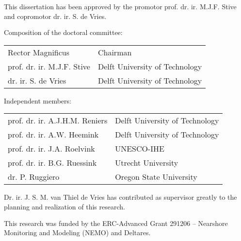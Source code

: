 \thispagestyle{empty}

\hfill

\vfill

\noindent This dissertation has been approved by the promotor
prof. dr. ir. M.J.F. Stive and copromotor dr. ir. S. de Vries.

\bigskip

\noindent Composition of the doctoral committee:

\begin{table}[h]
  \begin{tabular}{p{5cm} l}
    Rector Magnificus              & Chairman \\
    prof. dr. ir. M.J.F. Stive     & Delft University of Technology \\
    dr. ir. S. de Vries            & Delft University of Technology \\
  \end{tabular}
\end{table}

\noindent Independent members:

\begin{table}[h]
  \begin{tabular}{p{5cm} l}
    prof. dr. ir. A.J.H.M. Reniers & Delft University of Technology \\
    prof. dr. ir. A.W. Heemink     & Delft University of Technology \\
    prof. dr. ir. J.A. Roelvink    & UNESCO-IHE \\
    prof. dr. ir. B.G. Ruessink    & Utrecht University \\
    dr. P. Ruggiero                & Oregon State University \\
  \end{tabular}
\end{table}

\vfill

\noindent Dr. ir. J. S. M. van Thiel de Vries has contributed as
supervisor greatly to the planning and realization of this research.

\bigskip

\noindent This research was funded by the ERC-Advanced Grant 291206 --
Nearshore Monitoring and Modeling (NEMO) and Deltares.

